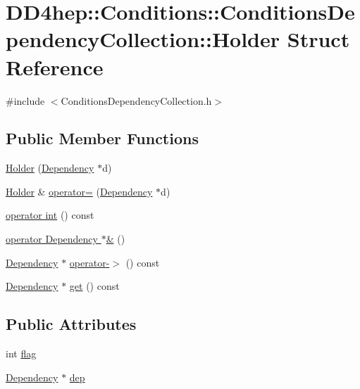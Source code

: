 \hypertarget{struct_d_d4hep_1_1_conditions_1_1_conditions_dependency_collection_1_1_holder}{
\section{DD4hep::Conditions::ConditionsDependencyCollection::Holder Struct Reference}
\label{struct_d_d4hep_1_1_conditions_1_1_conditions_dependency_collection_1_1_holder}
}


{\ttfamily \#include $<$ConditionsDependencyCollection.h$>$}\subsection*{Public Member Functions}
\begin{DoxyCompactItemize}
\item 
\hyperlink{struct_d_d4hep_1_1_conditions_1_1_conditions_dependency_collection_1_1_holder_a2eb63a4f316a695d951a31ef4d230fee}{Holder} (\hyperlink{class_d_d4hep_1_1_conditions_1_1_condition_dependency}{Dependency} $\ast$d)
\item 
\hyperlink{struct_d_d4hep_1_1_conditions_1_1_conditions_dependency_collection_1_1_holder}{Holder} \& \hyperlink{struct_d_d4hep_1_1_conditions_1_1_conditions_dependency_collection_1_1_holder_a2a2c20e8415f2366ff083542b73a225a}{operator=} (\hyperlink{class_d_d4hep_1_1_conditions_1_1_condition_dependency}{Dependency} $\ast$d)
\item 
\hyperlink{struct_d_d4hep_1_1_conditions_1_1_conditions_dependency_collection_1_1_holder_a93a5071aba32e3d019137f74cd320d3c}{operator int} () const 
\item 
\hyperlink{struct_d_d4hep_1_1_conditions_1_1_conditions_dependency_collection_1_1_holder_ae43b3cf1f6220bcea19b735766b017b0}{operator Dependency $\ast$\&} ()
\item 
\hyperlink{class_d_d4hep_1_1_conditions_1_1_condition_dependency}{Dependency} $\ast$ \hyperlink{struct_d_d4hep_1_1_conditions_1_1_conditions_dependency_collection_1_1_holder_a32d917579447f88e43ea7314f4338e42}{operator-\/$>$} () const 
\item 
\hyperlink{class_d_d4hep_1_1_conditions_1_1_condition_dependency}{Dependency} $\ast$ \hyperlink{struct_d_d4hep_1_1_conditions_1_1_conditions_dependency_collection_1_1_holder_a63b5df08ae719a69f2d76129f8a207ad}{get} () const 
\end{DoxyCompactItemize}
\subsection*{Public Attributes}
\begin{DoxyCompactItemize}
\item 
int \hyperlink{struct_d_d4hep_1_1_conditions_1_1_conditions_dependency_collection_1_1_holder_a0e505e33fbee2f24378e55527d99c6d3}{flag}
\item 
\hyperlink{class_d_d4hep_1_1_conditions_1_1_condition_dependency}{Dependency} $\ast$ \hyperlink{struct_d_d4hep_1_1_conditions_1_1_conditions_dependency_collection_1_1_holder_a958102c9c47e86d3f479021dd1e570f6}{dep}
\end{DoxyCompactItemize}


